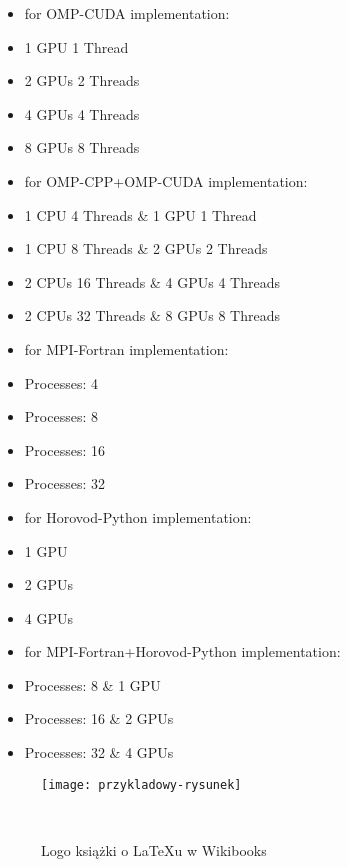 \begin{itemize}
\begin{itemize}
            \item for OMP-CUDA implementation:
            \item 1 GPU 1 Thread
            \item 2 GPUs 2 Threads
            \item 4 GPUs 4 Threads
            \item 8 GPUs 8 Threads
        \end{itemize}
        \begin{itemize}
            \item for OMP-CPP+OMP-CUDA implementation:
            \item 1 CPU 4 Threads \& 1 GPU 1 Thread
            \item 1 CPU 8 Threads \& 2 GPUs 2 Threads
            \item 2 CPUs 16 Threads \& 4 GPUs 4 Threads
            \item 2 CPUs 32 Threads \& 8 GPUs 8 Threads
        \end{itemize}
        \begin{itemize}
            \item for MPI-Fortran implementation:
            \item Processes: 4
            \item Processes: 8
            \item Processes: 16
            \item Processes: 32
        \end{itemize}
        \begin{itemize}
            \item for Horovod-Python implementation:
            \item 1 GPU
            \item 2 GPUs
            \item 4 GPUs
        \end{itemize}
        \begin{itemize}
            \item for MPI-Fortran+Horovod-Python implementation:
            \item Processes: 8 \& 1 GPU
            \item Processes: 16 \& 2 GPUs
            \item Processes: 32 \& 4 GPUs
        \end{itemize}
\end{itemize}

\begin{figure}[!htb]
    \centering
    \texttt{[image: przykladowy-rysunek]}
    \caption{Logo książki o LaTeXu w Wikibooks~\cite{book:latex}}~\label{fig:General-Flowchart}
\end{figure}

